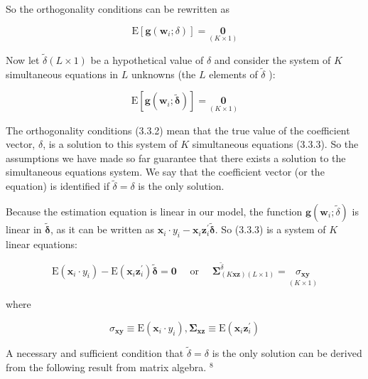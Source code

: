 \documentclass[10pt]{article}
\begin{document}
So the orthogonality conditions can be rewritten as


\begin{equation*}
\mathrm{E}\left[\mathbf{g}\left(\mathbf{w}_{i} ; \delta\right)\right]=\underset{(K \times 1)}{\mathbf{0}} \tag{3.3.2}
\end{equation*}


Now let $\tilde{\delta}(L \times 1)$ be a hypothetical value of $\delta$ and consider the system of $K$ simultaneous equations in $L$ unknowns (the $L$ elements of $\tilde{\delta}$ ):


\begin{equation*}
\mathrm{E}\left[\mathbf{g}\left(\mathbf{w}_{i} ; \tilde{\boldsymbol{\delta}}\right)\right]=\underset{(K \times 1)}{\mathbf{0}} \tag{3.3.3}
\end{equation*}


The orthogonality conditions (3.3.2) mean that the true value of the coefficient vector, $\delta$, is a solution to this system of $K$ simultaneous equations (3.3.3). So the assumptions we have made so far guarantee that there exists a solution to the simultaneous equations system. We say that the coefficient vector (or the equation) is identified if $\tilde{\delta}=\delta$ is the only solution.

Because the estimation equation is linear in our model, the function $\mathbf{g}\left(\mathbf{w}_{i} ; \tilde{\delta}\right)$ is linear in $\tilde{\boldsymbol{\delta}}$, as it can be written as $\mathbf{x}_{i} \cdot y_{i}-\mathbf{x}_{i} \mathbf{z}_{i}^{\prime} \tilde{\boldsymbol{\delta}}$. So (3.3.3) is a system of $K$ linear equations:


\begin{equation*}
\mathrm{E}\left(\mathbf{x}_{i} \cdot y_{i}\right)-\mathrm{E}\left(\mathbf{x}_{i} \mathbf{z}_{i}^{\prime}\right) \tilde{\boldsymbol{\delta}}=\mathbf{0} \quad \text { or } \quad \boldsymbol{\Sigma}_{(K \mathbf{x} \mathbf{z})(L \times 1)}^{\tilde{\delta}}=\underset{(K \times 1)}{\sigma_{\mathbf{x y}}} \tag{3.3.4}
\end{equation*}


where

$$
\sigma_{\mathbf{x y}} \equiv \mathrm{E}\left(\mathbf{x}_{i} \cdot y_{i}\right), \boldsymbol{\Sigma}_{\mathbf{x z}} \equiv \mathrm{E}\left(\mathbf{x}_{i} \mathbf{z}_{i}^{\prime}\right)
$$

A necessary and sufficient condition that $\tilde{\delta}=\delta$ is the only solution can be derived from the following result from matrix algebra. ${ }^{8}$
\end{document}
